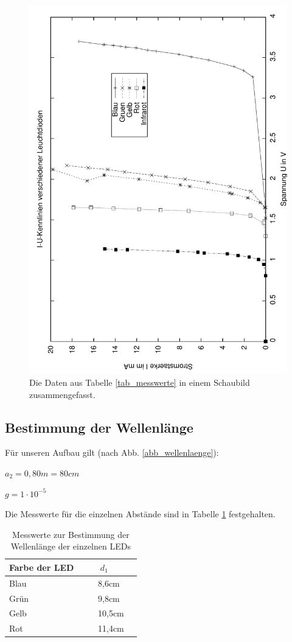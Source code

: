 \begin{figure}
   \centering
   \includegraphics[height=\textwidth,angle=-90]{praktika/mat_praktika/plot01_01}
   \caption{Die Daten aus Tabelle \ref{tab_messwerte} in einem Schaubild zusammengefasst.}
   \label{abb_kennlinie}
\end{figure}








\subsection{Bestimmung der Wellenlänge}

Für unseren Aufbau gilt (nach Abb. \ref{abb_wellenlaenge}):

$a_2 = 0,80m = 80cm$

$g = 1 \cdot 10^{-5}$

Die Messwerte für die einzelnen Abstände sind in Tabelle \ref{tab_d_1} festgehalten.



\begin{table}[h]
   \centering
   \begin{tabular}{l l l}
   Farbe der LED & ~~~ $d_1$\\
   \hline
      Blau & ~~~ 8,6cm\\
      Grün & ~~~ 9,8cm\\
      Gelb & ~~~ 10,5cm\\
      Rot & ~~~ 11,4cm
   \end{tabular}
\caption{Messwerte zur Bestimmung der Wellenlänge der einzelnen LEDs}
\label{tab_d_1}
\end{table}







